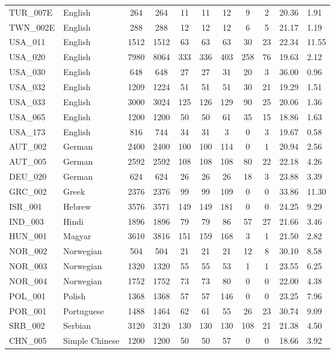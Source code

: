 \documentclass[
  man]{apa7}
\begin{document}
\begin{table}
\begin{tabular}[t]{llcccccccll}
TUR\_007E & English & 264 & 264 & 11 & 11 & 12 & 9 & 2 & 20.36 & 1.91\\
TWN\_002E & English & 288 & 288 & 12 & 12 & 12 & 6 & 5 & 21.17 & 1.19\\
USA\_011 & English & 1512 & 1512 & 63 & 63 & 63 & 30 & 23 & 22.34 & 11.55\\
USA\_020 & English & 7980 & 8064 & 333 & 336 & 403 & 258 & 76 & 19.63 & 2.12\\
\addlinespace
USA\_030 & English & 648 & 648 & 27 & 27 & 31 & 20 & 3 & 36.00 & 0.96\\
USA\_032 & English & 1209 & 1224 & 51 & 51 & 51 & 30 & 21 & 19.29 & 1.51\\
USA\_033 & English & 3000 & 3024 & 125 & 126 & 129 & 90 & 25 & 20.06 & 1.36\\
USA\_065 & English & 1200 & 1200 & 50 & 50 & 61 & 35 & 15 & 18.86 & 1.63\\
USA\_173 & English & 816 & 744 & 34 & 31 & 3 & 0 & 3 & 19.67 & 0.58\\
\addlinespace
AUT\_002 & German & 2400 & 2400 & 100 & 100 & 114 & 0 & 1 & 20.94 & 2.56\\
AUT\_005 & German & 2592 & 2592 & 108 & 108 & 108 & 80 & 22 & 22.18 & 4.26\\
DEU\_020 & German & 624 & 624 & 26 & 26 & 26 & 18 & 3 & 23.88 & 3.39\\
GRC\_002 & Greek & 2376 & 2376 & 99 & 99 & 109 & 0 & 0 & 33.86 & 11.30\\
ISR\_001 & Hebrew & 3576 & 3571 & 149 & 149 & 181 & 0 & 0 & 24.25 & 9.29\\
\addlinespace
IND\_003 & Hindi & 1896 & 1896 & 79 & 79 & 86 & 57 & 27 & 21.66 & 3.46\\
HUN\_001 & Magyar & 3610 & 3816 & 151 & 159 & 168 & 3 & 1 & 21.50 & 2.82\\
NOR\_002 & Norwegian & 504 & 504 & 21 & 21 & 21 & 12 & 8 & 30.10 & 8.58\\
NOR\_003 & Norwegian & 1320 & 1320 & 55 & 55 & 53 & 1 & 1 & 23.55 & 6.25\\
NOR\_004 & Norwegian & 1752 & 1752 & 73 & 73 & 80 & 0 & 0 & 22.00 & 4.38\\
\addlinespace
POL\_001 & Polish & 1368 & 1368 & 57 & 57 & 146 & 0 & 0 & 23.25 & 7.96\\
POR\_001 & Portuguese & 1488 & 1464 & 62 & 61 & 55 & 26 & 23 & 30.74 & 9.09\\
SRB\_002 & Serbian & 3120 & 3120 & 130 & 130 & 130 & 108 & 21 & 21.38 & 4.50\\
CHN\_005 & Simple Chinese & 1200 & 1200 & 50 & 50 & 57 & 0 & 0 & 18.66 & 3.92\\

\end{tabular}
\end{table}
\end{document}
